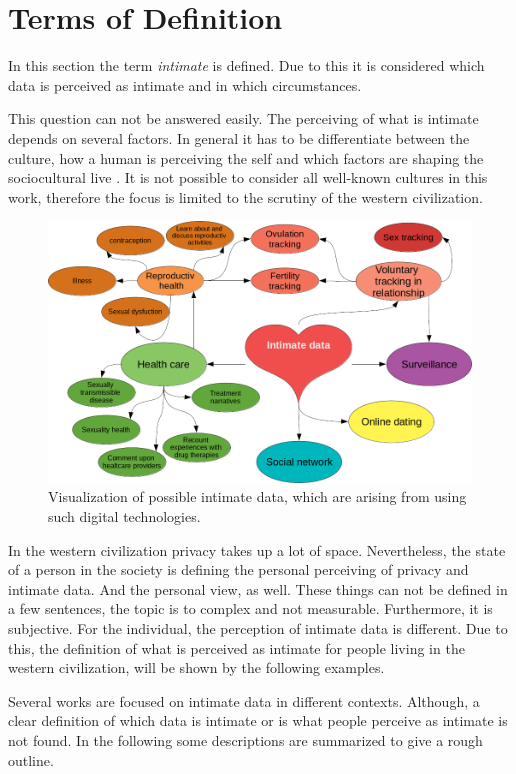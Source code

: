 \section{Terms of Definition}
\label{sec:terms_of_definition}
In this section the term \textit{intimate} is defined. Due to this it is considered which data is perceived as intimate and in which circumstances.

This question can not be answered easily. The perceiving of what is intimate depends on several factors.
In general it has to be differentiate between the culture, how a human is perceiving the self and which factors are shaping the sociocultural live \cite{carrithers1985category}. It is not possible to consider all well-known cultures in this work, therefore the focus is limited to the scrutiny of the western civilization. 
\begin{figure}[tb]
	\centering
	\includegraphics[width=\linewidth]{img/cluster_heart.png}
	\caption{Visualization of possible intimate data, which are arising from using such digital technologies.}
	\label{fig:cluster}
\end{figure}
In the western civilization privacy takes up a lot of space. %
 Nevertheless, the state of a person in the society is defining the personal perceiving of privacy and intimate data. And the personal view, as well.
These things can not be defined in a few sentences, the topic is to complex and not measurable. Furthermore, it is subjective. For the individual, the perception of intimate data is different. Due to this, the definition of what is perceived as intimate for people living in the western civilization, will be shown by the following examples.

Several works are focused on intimate data in different contexts. Although, a clear definition of which data is intimate or is what people perceive as intimate is not found.
In the following some descriptions are summarized to give a rough outline.

